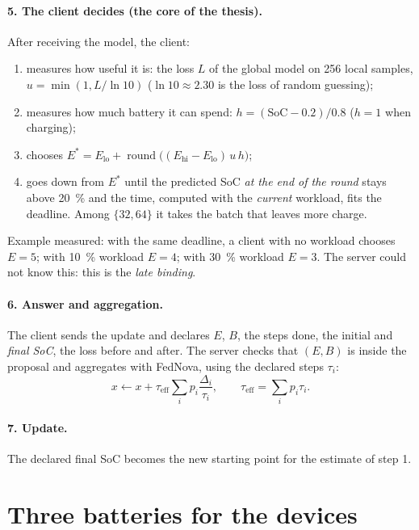 \documentclass[11pt,a4paper]{article}
\begin{document}
\paragraph{5. The client decides (the core of the thesis).} After receiving the
model, the client:
\begin{enumerate}
  \item measures how useful it is: the loss $L$ of the global model on 256 local samples,
        $u=\min(1, L/\ln 10)$ ($\ln 10 \approx 2.30$ is the loss of random guessing);
  \item measures how much battery it can spend: $h=(\mathrm{SoC}-0.2)/0.8$ ($h=1$ when charging);
  \item chooses $E^{*} = E_{\text{lo}} + \operatorname{round}\big((E_{\text{hi}}-E_{\text{lo}})\,u\,h\big)$;
  \item goes down from $E^{*}$ until the predicted SoC \emph{at the end of the round}
        stays above \SI{20}{\percent} and the time, computed with the
        \emph{current} workload, fits the deadline. Among $\{32,64\}$ it takes
        the batch that leaves more charge.
\end{enumerate}
Example measured: with the same deadline, a client with no workload chooses
$E=5$; with \SI{10}{\percent} workload $E=4$; with \SI{30}{\percent}
workload $E=3$. The server could not know this: this is the \emph{late binding}.

\paragraph{6. Answer and aggregation.} The client sends the update and declares
$E$, $B$, the steps done, the initial and \emph{final SoC}, the loss before and
after. The server checks that $(E,B)$ is inside the proposal and aggregates
with FedNova, using the declared steps $\tau_i$:
\[
  x \leftarrow x + \tau_{\text{eff}} \sum_i p_i \frac{\Delta_i}{\tau_i},
  \qquad \tau_{\text{eff}}=\sum_i p_i\tau_i .
\]

\paragraph{7. Update.} The declared final SoC becomes the new starting point
for the estimate of step 1.

\section{Three batteries for the devices}
\end{document}
